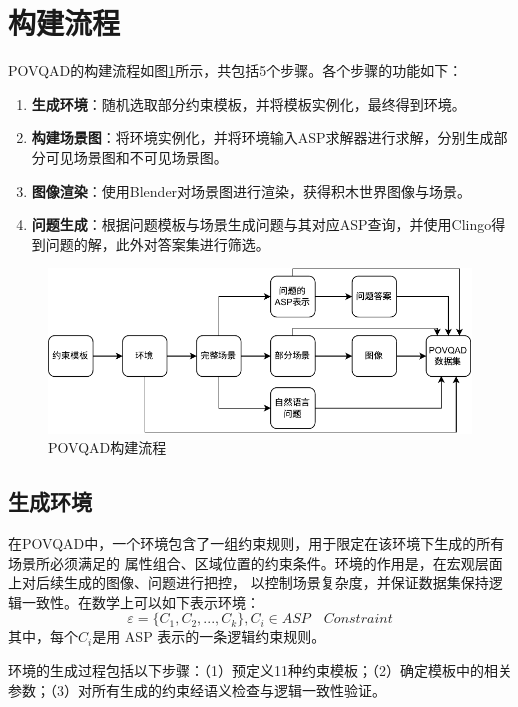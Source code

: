 \section{构建流程}
POVQAD的构建流程如图\ref{fig:dataset-generation}所示，共包括5个步骤。各个步骤的功能如下：
\begin{enumerate}[nosep]
\item \textbf{生成环境}：随机选取部分约束模板，并将模板实例化，最终得到环境。
\item \textbf{构建场景图}：将环境实例化，并将环境输入ASP求解器进行求解，分别生成部分可见场景图和不可见场景图。
\item \textbf{图像渲染}：使用Blender对场景图进行渲染，获得积木世界图像与场景。
\item \textbf{问题生成}：根据问题模板与场景生成问题与其对应ASP查询，并使用Clingo得到问题的解，此外对答案集进行筛选。
\end{enumerate}
\begin{figure}[h]
\centering
\includegraphics{figures/pipeline-POVQAD.drawio-crop.pdf}
\caption{POVQAD构建流程}
\label{fig:dataset-generation}
\end{figure}

\subsection{生成环境}
在POVQAD中，一个环境包含了一组约束规则，用于限定在该环境下生成的所有场景所必须满足的
属性组合、区域位置的约束条件。环境的作用是，在宏观层面上对后续生成的图像、问题进行把控，
以控制场景复杂度，并保证数据集保持逻辑一致性。在数学上可以如下表示环境：
$$ \varepsilon = \{C_1,C_2, ..., C_k \}, C_i \in ASP \quad Constraint $$
其中，每个$C_i$是用 ASP 表示的一条逻辑约束规则。

环境的生成过程包括以下步骤：（1）预定义11种约束模板；（2）确定模板中的相关参数；（3）对所有生成的约束经语义检查与逻辑一致性验证。

